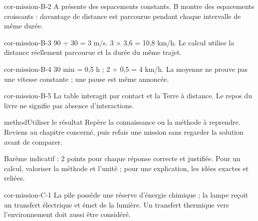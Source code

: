 \documentclass[12pt,twoside,openany]{book}
\begin{document}
\begin{blocLivre}{cor-mission-B-2}
A présente des espacements constants. B montre des espacements croissants : davantage de distance est parcourue pendant chaque intervalle de même durée.\par
{}
\end{blocLivre}
\begin{blocLivre}{cor-mission-B-3}
90 \(\div\) 30 = 3 m/s. 3 \(\times\) 3,6 = 10,8 km/h. Le calcul utilise la distance réellement parcourue et la durée du même trajet.\par
\end{blocLivre}
\begin{blocLivre}{cor-mission-B-4}
30 min = 0,5 h ; 2 \(\div\) 0,5 = 4 km/h. La moyenne ne prouve pas une vitesse constante ; une pause est même annoncée.\par
\end{blocLivre}
\begin{blocLivre}{cor-mission-B-5}
La table interagit par contact et la Terre à distance. Le repos du livre ne signifie pas absence d’interactions.\par
{}
\begin{pcEncadre}{method}{Utiliser le résultat}
Repère la connaissance ou la méthode à reprendre. Reviens au chapitre concerné, puis refais une mission sans regarder la solution avant de comparer.\par
\end{pcEncadre}
\end{blocLivre}
\label{cor-bilan-C}
Barème indicatif : 2 points pour chaque réponse correcte et justifiée. Pour un calcul, valoriser la méthode et l’unité ; pour une explication, les idées exactes et reliées.\par
\begin{blocLivre}{cor-mission-C-1}
La pile possède une réserve d’énergie chimique ; la lampe reçoit un transfert électrique et émet de la lumière. Un transfert thermique vers l’environnement doit aussi être considéré.\par
{}
\end{blocLivre}
\end{document}
